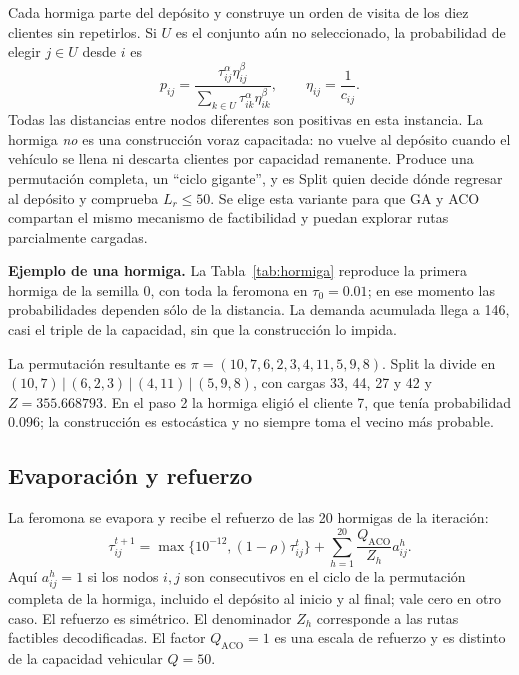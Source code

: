 \documentclass[11pt,a4paper]{article}
\numberwithin{equation}{section}
\begin{document}
Cada hormiga parte del depósito y construye un orden de visita de los diez clientes sin repetirlos. Si \(U\) es el conjunto aún no seleccionado, la probabilidad de elegir \(j\in U\) desde \(i\) es
\begin{equation}\label{eq:prob}
p_{ij}=\frac{\tau_{ij}^{\alpha}\eta_{ij}^{\beta}}{\sum_{k\in U}\tau_{ik}^{\alpha}\eta_{ik}^{\beta}},\qquad \eta_{ij}=\frac{1}{c_{ij}}.
\end{equation}
Todas las distancias entre nodos diferentes son positivas en esta instancia. La hormiga \emph{no} es una construcción voraz capacitada: no vuelve al depósito cuando el vehículo se llena ni descarta clientes por capacidad remanente. Produce una permutación completa, un ``ciclo gigante'', y es Split quien decide dónde regresar al depósito y comprueba \(L_r\le 50\). Se elige esta variante para que GA y ACO compartan el mismo mecanismo de factibilidad y puedan explorar rutas parcialmente cargadas.

\textbf{Ejemplo de una hormiga.} La Tabla~\ref{tab:hormiga} reproduce la primera hormiga de la semilla 0, con toda la feromona en \(\tau_0=0.01\); en ese momento las probabilidades dependen sólo de la distancia. La demanda acumulada llega a 146, casi el triple de la capacidad, sin que la construcción lo impida.

\begin{table}[H]\centering\small
\caption{Construcción de la primera hormiga de la semilla 0 (\(\alpha=1\), \(\beta=2\), feromona inicial).}\label{tab:hormiga}

\end{table}

La permutación resultante es \(\pi=(10,7,6,2,3,4,11,5,9,8)\). Split la divide en \((10,7)\,|\,(6,2,3)\,|\,(4,11)\,|\,(5,9,8)\), con cargas 33, 44, 27 y 42 y \(Z=355.668793\). En el paso 2 la hormiga eligió el cliente 7, que tenía probabilidad 0.096; la construcción es estocástica y no siempre toma el vecino más probable.

\subsection{Evaporación y refuerzo}\label{sec:feromona}

La feromona se evapora y recibe el refuerzo de las 20 hormigas de la iteración:
\begin{equation}\label{eq:tau}
\tau_{ij}^{t+1}=\max\{10^{-12},(1-\rho)\tau_{ij}^{t}\}+\sum_{h=1}^{20}\frac{Q_{\mathrm{ACO}}}{Z_h}a_{ij}^{h}.
\end{equation}
Aquí \(a_{ij}^h=1\) si los nodos \(i,j\) son consecutivos en el ciclo de la permutación completa de la hormiga, incluido el depósito al inicio y al final; vale cero en otro caso. El refuerzo es simétrico. El denominador \(Z_h\) corresponde a las rutas factibles decodificadas. El factor \(Q_{\mathrm{ACO}}=1\) es una escala de refuerzo y es distinto de la capacidad vehicular \(Q=50\).
\end{document}

